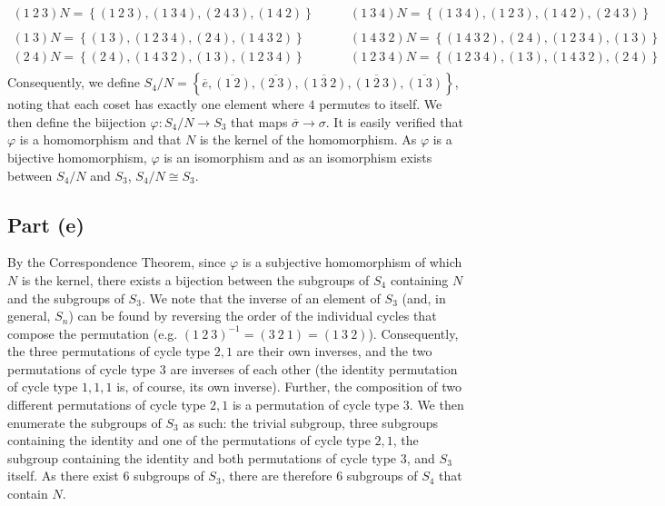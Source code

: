\documentclass{article}
\begin{document}
\begin{equation*}
\begin{split}
        \left(1~2~3\right)N = \left\{\left(1~2~3\right), \left(1~3~4\right), \left(2~4~3\right), \left(1~4~2\right)\right\} \quad & \quad \left(1~3~4\right)N = \left\{\left(1~3~4\right), \left(1~2~3\right), \left(1~4~2\right), \left(2~4~3\right)\right\} \\ \\
        \left(1~3\right)N = \left\{\left(1~3\right), \left(1~2~3~4\right), \left(2~4\right), \left(1~4~3~2\right)\right\} \quad & \quad \left(1~4~3~2\right)N = \left\{\left(1~4~3~2\right), \left(2~4\right), \left(1~2~3~4\right), \left(1~3\right)\right\} \\
        \left(2~4\right)N = \left\{\left(2~4\right), \left(1~4~3~2\right), \left(1~3\right), \left(1~2~3~4\right)\right\} \quad & \quad \left(1~2~3~4\right)N = \left\{\left(1~2~3~4\right), \left(1~3\right), \left(1~4~3~2\right), \left(2~4\right)\right\} \\
    \end{split}
\end{equation*}
Consequently, we define $S_4 / N = \left\{\overline{e} ,\overline{\left(1~2\right)},  \overline{\left(2~3\right)}, \overline{\left(1~3~2\right)}, \overline{\left(1~2~3\right)}, \overline{\left(1~3\right)}\right\}$, noting that each coset has exactly one element where $4$ permutes to itself. We then define the biijection $\varphi : S_4 / N \to S_3$ that maps $\overline{\sigma} \to \sigma$.  It is easily verified that $\varphi$ is a homomorphism and that $N$ is the kernel of the homomorphism. As $\varphi$ is a bijective homomorphism, $\varphi$ is an isomorphism and as an isomorphism exists between $S_4 / N$ and $S_3$, $S_4 / N \cong S_3$.
\subsection*{Part (e)}
By the Correspondence Theorem, since $\varphi$ is a subjective homomorphism of which $N$ is the kernel, there exists a bijection between the subgroups of $S_4$ containing $N$ and the subgroups of $S_3$. We note that the inverse of an element of $S_3$ (and, in general, $S_n$) can be found by reversing the order of the individual cycles that compose the permutation (e.g. $\left(1~2~3\right)^{-1} = \left(3~2~1\right) = \left(1~3~2\right)$). Consequently, the three permutations of cycle type $2,1$ are their own inverses, and the two permutations of cycle type $3$ are inverses of each other (the identity permutation of cycle type $1,1,1$ is, of course, its own inverse). Further, the composition of two different permutations of cycle type $2,1$ is a permutation of cycle type $3$. We then enumerate the subgroups of $S_3$ as such: the trivial subgroup, three subgroups containing the identity and one of the permutations of cycle type $2,1$, the subgroup containing the identity and both permutations of cycle type $3$, and $S_3$ itself. As there exist $6$ subgroups of $S_3$, there are therefore $6$ subgroups of $S_4$ that contain $N$.
\end{document}
